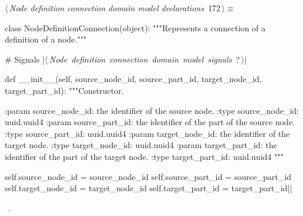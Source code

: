 \documentclass[%
    a4paper,    %
    justified,  %
    nobib,      %
    openany     %
]{tufte-book}
\begin{document}
\begin{flushleft} \small
\begin{minipage}{\linewidth}\label{scrap196}\raggedright\small
{} $\langle\,${\itshape Node definition connection domain model declarations}\nobreak\ {\footnotesize {172}}$\,\rangle\equiv$
\vspace{-1ex}
\begin{pythoncode}
class NodeDefinitionConnection(object):
    """Represents a connection of a definition of a node."""

    # Signals
    |\hbox{$\langle\,${\itshape Node definition connection domain model signals}\nobreak\ {\footnotesize ?}$\,\rangle$}|

    def __init__(self,
                 source_node_id, source_part_id,
                 target_node_id, target_part_id):
        """Constructor.

        :param source_node_id: the identifier of the source node.
        :type  source_node_id: uuid.uuid4
        :param source_part_id: the identifier of the part of the source node.
        :type  source_part_id: uuid.uuid4
        :param target_node_id: the identifier of the target node.
        :type  target_node_id: uuid.uuid4
        :param target_part_id: the identifier of the part of the target node.
        :type  target_part_id: uuid.uuid4
        """

        self.source_node_id = source_node_id
        self.source_part_id = source_part_id
        self.target_node_id = target_node_id
        self.target_part_id = target_part_id|\NWsep|
\end{pythoncode}
\vspace{1.5ex}
\footnotesize
\begin{list}{}{\setlength{\itemsep}{-\parsep}\setlength{\itemindent}{-\leftmargin}}
\item \NWtxtMacroRefIn\ .

\item{}
\end{list}
\end{minipage}\vspace{4ex}
\end{flushleft}
\end{document}
